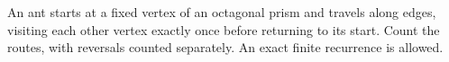 An ant starts at a fixed vertex of an octagonal prism and travels along edges, visiting each other vertex exactly once before returning to its start. Count the routes, with reversals counted separately. An exact finite recurrence is allowed.
